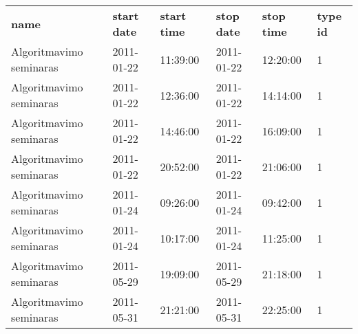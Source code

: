 \begin{tabularx}{\textwidth}{p{6em} X X X X X}
  { \bf name }              & { \bf start date} & { \bf start time} & { \bf stop date} 
  &  { \bf stop time} & { \bf type id}\\
  Algoritmavimo seminaras   & 2011-01-22  & 11:39:00   & 2011-01-22 &  12:20:00   & 1\\
  Algoritmavimo seminaras   & 2011-01-22  & 12:36:00   & 2011-01-22 &  14:14:00   & 1\\
  Algoritmavimo seminaras   & 2011-01-22  & 14:46:00   & 2011-01-22 &  16:09:00   & 1\\
  Algoritmavimo seminaras   & 2011-01-22  & 20:52:00   & 2011-01-22 &  21:06:00   & 1\\
  Algoritmavimo seminaras   & 2011-01-24  & 09:26:00   & 2011-01-24 &  09:42:00   & 1\\
  Algoritmavimo seminaras   & 2011-01-24  & 10:17:00   & 2011-01-24 &  11:25:00   & 1\\
  Algoritmavimo seminaras   & 2011-05-29  & 19:09:00   & 2011-05-29 &  21:18:00   & 1\\
  Algoritmavimo seminaras   & 2011-05-31  & 21:21:00   & 2011-05-31 &  22:25:00   & 1\\

\end{tabularx}
